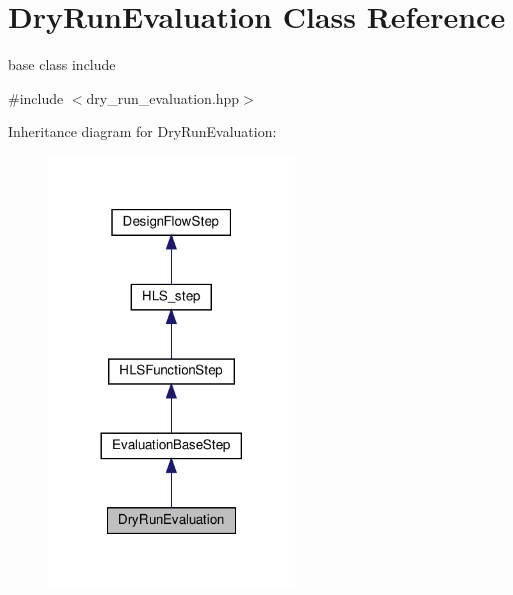 \hypertarget{classDryRunEvaluation}{}\section{Dry\+Run\+Evaluation Class Reference}
\label{classDryRunEvaluation}


base class include  




{\ttfamily \#include $<$dry\+\_\+run\+\_\+evaluation.\+hpp$>$}



Inheritance diagram for Dry\+Run\+Evaluation\+:
\nopagebreak
\begin{figure}[H]
\begin{center}
\leavevmode
\includegraphics[width=185pt]{d1/de9/classDryRunEvaluation__inherit__graph}
\end{center}
\end{figure}


